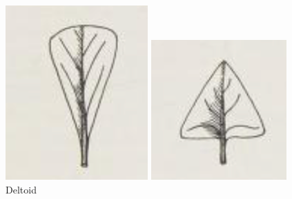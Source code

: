 \documentclass[12pt,english]{article}
\begin{document}
\begin{figure}[!hbt]
\begin{centre}
\begin{minipage}{0.19\textwidth}
		\includegraphics[width=\textwidth]{../code/contour/original/cuneate}
	\end{minipage}
	\begin{minipage}{0.19\textwidth}
		\caption{Deltoid}
		\includegraphics[width=\textwidth]{../code/contour/original/deltoid}

\end{minipage}
\end{centre}
\end{figure}
\end{document}
